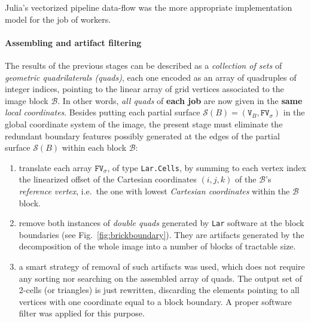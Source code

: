Julia's vectorized pipeline data-flow was the more appropriate implementation model for the job of workers.

\paragraph{Assembling and artifact filtering}\label{sec:artifact-filtering}
The results of the previous stages can be described as a \emph{collection of sets} of \emph{geometric quadrilaterals (quads)}, each one encoded as an array of quadruples of integer indices, pointing to the linear array of grid vertices associated to the image block $\mathcal{B}$.  In other words, \emph{all quads} of \textbf{each job} are now given in the \textbf{same} \emph{local coordinates}.  Besides putting each partial surface $\mathcal{S}(B) = (\texttt{V}_B, \texttt{FV}_\sigma)$ in the global coordinate system of the image, the present stage must eliminate the redundant boundary features possibly generated at the edges of the partial surface $\mathcal{S}(B)$ within each block $\mathcal{B}$:

\begin{enumerate}

\item translate each array $\mathtt{FV}_\sigma$, of type \texttt{Lar.Cells}, by summing to each vertex index the linearized offset of the Cartesian coordinates $(i,j,k)$ of the $\mathcal{B}$'s \emph{reference vertex}, i.e.~the one with lowest \emph{Cartesian coordinates} within the $\mathcal{B}$ block.

\item remove both instances of \emph{double quads} generated by \texttt{Lar} software at the block boundaries 
(see Fig.~\ref{fig:brickboundary}). 
They are artifacts generated by the decomposition of the whole image into a number of blocks of tractable size.

\item 
a smart strategy of removal of such artifacts was used, which does not require any sorting nor searching on the assembled array of quads. The output set of 2-cells (or triangles) is just rewritten, discarding the elements pointing to all vertices with one coordinate equal to a block boundary. A proper software filter was applied for this purpose.

\end{enumerate}

